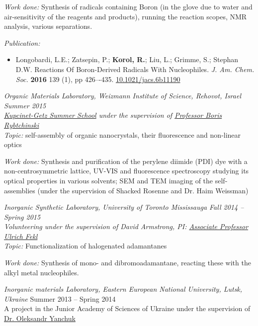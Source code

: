 \documentclass[9pt, margin]{res}
\begin{document}
\begin{resume}
\textit{Work done:}
Synthesis of radicals containing Boron (in the glove due to water and air-sensitivity of the reagents and products), running the reaction scopes, NMR analysis, various separations.

\textit{Publication:}
\begin{itemize}
	\item Longobardi, L.E.; Zatsepin, P.; \textbf{Korol, R.}; Liu, L.; Grimme, S.; Stephan D.W. Reactions Of Boron-Derived Radicals With Nucleophiles. \textit{J. Am. Chem. Soc.} \textbf{2016} 139 (1), pp 426–-435. \href{http://pubs.acs.org/doi/abs/10.1021%2Fjacs.6b11190}{10.1021/jacs.6b11190} 
\end{itemize}

{\sl Organic Materials Laboratory, Weizmann Institute of Science, Rehovot, Israel \hfill Summer 2015 \\
\href{https://www.weizmann.ac.il/feinberg/admissions/kupcinet-getz-international-Summer-school/about-program-0}{Kupcinet-Getz Summer School} under the supervision of \href{https://www.weizmann.ac.il/Organic_Chemistry/Rybtchinski/}{Professor Boris Rybtchinski}}\\
\textit{Topic:} self-assembly of organic nanocrystals, their fluorescence and non-linear optics

\textit{Work done:} Synthesis and purification of the perylene diimide (PDI) dye with a non-centrosymmetric lattice, UV-VIS and fluorescence spectroscopy studying its optical properties in various solvents; SEM and TEM imaging of the self-assemblies (under the supervision of Shacked Rosenne and Dr. Haim Weissman) 
\newline \newline

{\sl Inorganic Synthetic Laboratory, University of Toronto Mississauga \hfill Fall 2014 -- Spring 2015 \\
Volunteering under the supervision of David Armstrong, PI: \href{http://www.utm.utoronto.ca/fekl/}{Associate Professor Ulrich Fekl}}\\
\textit{Topic:} Functionalization of halogenated adamantanes

\textit{Work done:} Synthesis of mono- and dibromoadamantane, reacting these with the alkyl metal nucleophiles.  
\newline\newline\newline

{\sl Inorganic materials Laboratory, Eastern European National University, Lutsk, Ukraine} 
\newline Summer 2013 -- Spring 2014 \\
A project in the Junior Academy of Sciences of Ukraine under the supervision of \href{https://scholar.google.com.ua/citations?user=m7yvotUAAAAJ&hl=ru}{Dr. Oleksandr Yanchuk}


\end{resume}
\end{document}
